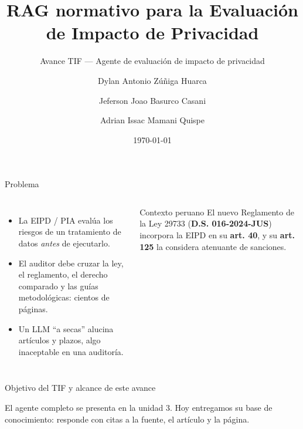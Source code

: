 \documentclass[aspectratio=169,10pt]{beamer}
\title{RAG normativo para la Evaluación de Impacto de Privacidad}
\subtitle{Avance TIF --- Agente de evaluación de impacto de privacidad}
\author{Dylan Antonio Zúñiga Huarca \and Jeferson Joao Basurco Casani \and Adrian Issac Mamani Quispe}
\institute{Auditoría de Sistemas · Escuela Profesional de Ingeniería de Sistemas · UNSA}
\date{\today}
\begin{document}
\maketitle

\begin{frame}{Problema}
\begin{columns}[T]
\begin{itemize}
  \item La \alert{EIPD / PIA} evalúa los riesgos de un tratamiento de datos \emph{antes} de ejecutarlo.
  \item El auditor debe cruzar la ley, el reglamento, el derecho comparado y las guías metodológicas: \alert{cientos de páginas}.
  \item Un LLM ``a secas'' \alert{alucina} artículos y plazos, algo inaceptable en una auditoría.
\end{itemize}
\begin{block}{Contexto peruano}
\small El nuevo Reglamento de la Ley 29733 (\textbf{D.S. 016-2024-JUS}) incorpora la EIPD en su \textbf{art. 40}, y su \textbf{art. 125} la considera atenuante de sanciones.
\end{block}
\end{columns}
\end{frame}

\begin{frame}{Objetivo del TIF y alcance de este avance}
\begin{center}
\end{center}
\small El agente completo se presenta en la unidad 3. Hoy entregamos su \alert{base de conocimiento}: responde con citas a la fuente, el artículo y la página.
\end{frame}
\end{document}
